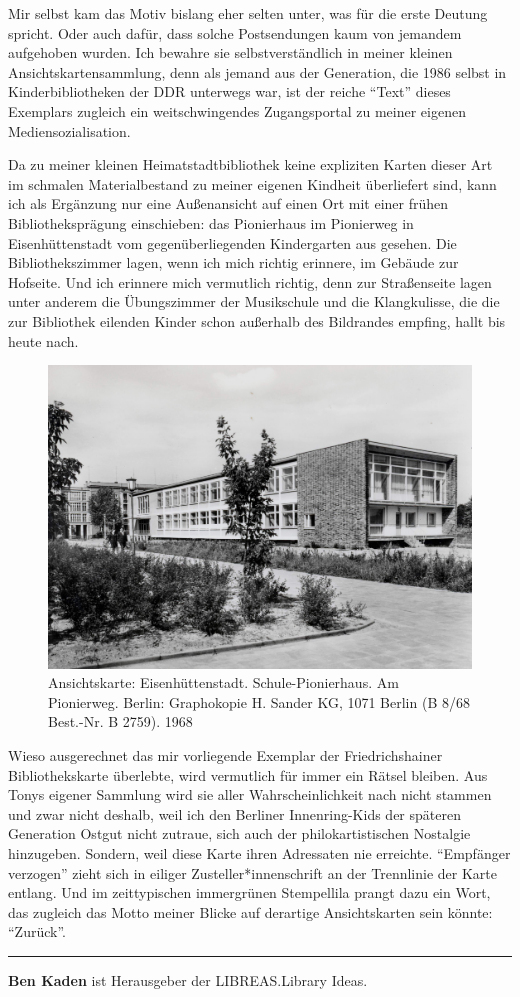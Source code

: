 \documentclass[a4paper,
fontsize=11pt,
oneside,
numbers=noperiodatend,
parskip=half-,
bibliography=totoc,
final
]{scrartcl}
\begin{document}
Mir selbst kam das Motiv bislang eher selten unter, was für die erste
Deutung spricht. Oder auch dafür, dass solche Postsendungen kaum von
jemandem aufgehoben wurden. Ich bewahre sie selbstverständlich in meiner
kleinen Ansichtskartensammlung, denn als jemand aus der Generation, die
1986 selbst in Kinderbibliotheken der DDR unterwegs war, ist der reiche
\enquote{Text} dieses Exemplars zugleich ein weitschwingendes
Zugangsportal zu meiner eigenen Mediensozialisation.

Da zu meiner kleinen Heimatstadtbibliothek keine expliziten Karten
dieser Art im schmalen Materialbestand zu meiner eigenen Kindheit
überliefert sind, kann ich als Ergänzung nur eine Außenansicht auf einen
Ort mit einer frühen Bibliotheksprägung einschieben: das Pionierhaus im
Pionierweg in Eisenhüttenstadt vom gegenüberliegenden Kindergarten aus
gesehen. Die Bibliothekszimmer lagen, wenn ich mich richtig erinnere, im
Gebäude zur Hofseite. Und ich erinnere mich vermutlich richtig, denn zur
Straßenseite lagen unter anderem die Übungszimmer der Musikschule und
die Klangkulisse, die die zur Bibliothek eilenden Kinder schon außerhalb
des Bildrandes empfing, hallt bis heute nach.

\begin{figure}
\centering
\includegraphics{img/abb3.jpg}
\caption{Ansichtskarte: Eisenhüttenstadt. Schule-Pionierhaus. Am
Pionierweg. Berlin: Graphokopie H. Sander KG, 1071 Berlin (B 8/68
Best.-Nr. B 2759). 1968}
\end{figure}

Wieso ausgerechnet das mir vorliegende Exemplar der Friedrichshainer
Bibliothekskarte überlebte, wird vermutlich für immer ein Rätsel
bleiben. Aus Tonys eigener Sammlung wird sie aller Wahrscheinlichkeit
nach nicht stammen und zwar nicht deshalb, weil ich den Berliner
Innenring-Kids der späteren Generation Ostgut nicht zutraue, sich auch
der philokartistischen Nostalgie hinzugeben. Sondern, weil diese Karte
ihren Adressaten nie erreichte. \enquote{Empfänger verzogen} zieht sich
in eiliger Zusteller*innenschrift an der Trennlinie der Karte entlang.
Und im zeittypischen immergrünen Stempellila prangt dazu ein Wort, das
zugleich das Motto meiner Blicke auf derartige Ansichtskarten sein
könnte: \enquote{Zurück}.

\begin{center}\rule{0.5\linewidth}{0.5pt}\end{center}

\textbf{Ben Kaden} ist Herausgeber der LIBREAS.Library Ideas.
\end{document}
